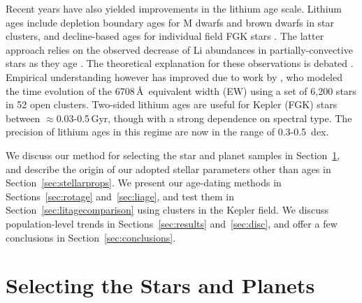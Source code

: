 \documentclass[11pt,twocolumn,tighten]{aastex63}
\begin{document}
Recent years have also yielded improvements in the
lithium age scale.  Lithium ages include depletion boundary ages for M
dwarfs and brown dwarfs in star clusters, and decline-based ages for
individual field FGK stars \citep{Soderblom_2010}.  The latter
approach relies on the observed decrease of Li abundances in
partially-convective stars as they age
\citep[e.g.][]{2005A&A...442..615S}.  The theoretical explanation for
these observations is debated
\citep[e.g.][]{1995ApJ...441..865C,2010ApJ...716.1269D,2019MNRAS.485.4052C}.
Empirical understanding however has improved due to work by
\citet{Jeffries_2023}, who modeled the time evolution of the
 6708\,\AA\ equivalent width (EW) using a set of 6{,}200
stars in 52 open clusters.  Two-sided lithium ages are useful for
Kepler (FGK) stars between $\approx$0.03-0.5\,Gyr, though with a
strong dependence on spectral type.  The precision of lithium ages in
this regime are now in the range of 0.3-0.5~dex.

We discuss our method for selecting the star and planet samples in
Section~\ref{sec:selection}, and describe the origin of our adopted
stellar parameters other than ages in Section~\ref{sec:stellarprops}.
We present our age-dating methods in Sections~\ref{sec:rotage}
and~\ref{sec:liage}, and test them in
Section~\ref{sec:litagecomparison} using clusters in the Kepler field.
We discuss population-level trends in Sections~\ref{sec:results}
and~\ref{sec:disc}, and offer a few conclusions in
Section~\ref{sec:conclusions}.


\section{Selecting the Stars and Planets}
\label{sec:selection}
\end{document}
